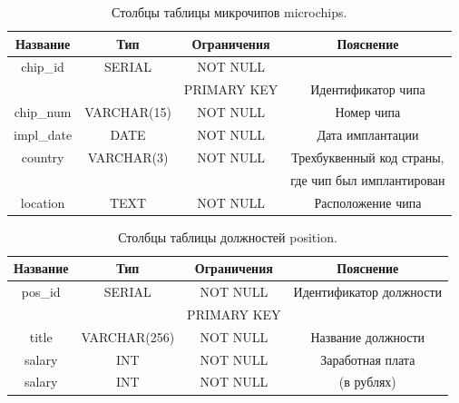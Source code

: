 \documentclass[a4paper,14pt]{article}
\begin{document}
\begin{table}[!h]
	\caption{Столбцы таблицы микрочипов microchips.}
	\begin{center}
		\begin{tabular}{| c | c | c | c |}
	 	\hline
		Название & Тип & Ограничения & Пояснение \\ \hline
		chip\_id & SERIAL & NOT NULL &  \\
		 &  & PRIMARY KEY & Идентификатор чипа \\ \hline
		chip\_num & VARCHAR(15) & NOT NULL & Номер чипа \\ \hline
		impl\_date & DATE & NOT NULL & Дата имплантации \\ \hline
		country & VARCHAR(3) & NOT NULL & Трехбуквенный код страны, \\
		&  &  & где чип был имплантирован \\ \hline
		location & TEXT & NOT NULL & Расположение чипа \\ \hline
	\end{tabular}
	\end{center}
\end{table}

\newpage
\begin{table}[!h]
	\caption{Столбцы таблицы должностей position.}
	\begin{center}
		\begin{tabular}{| c | c | c | c |}
	 	\hline
		Название & Тип & Ограничения & Пояснение \\ \hline
		pos\_id & SERIAL & NOT NULL & Идентификатор должности \\
		 &  & PRIMARY KEY &  \\ \hline
		title & VARCHAR(256) & NOT NULL & Название должности \\ \hline
		salary & INT & NOT NULL & Заработная плата \\
		salary & INT & NOT NULL & (в рублях) \\ \hline
	\end{tabular}
	\end{center}
\end{table}
\end{document}

